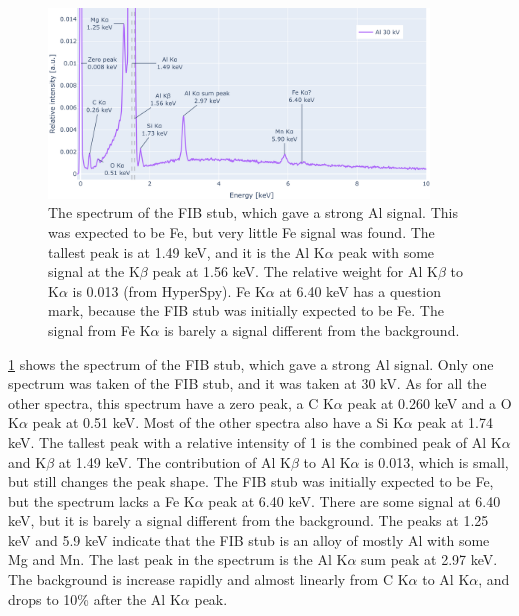 \begin{figure}[h!]
    \centering
    \includegraphics[width=0.90\textwidth]{figures/each_spectra/Al_everything.png}
    \caption{
        The spectrum of the FIB stub, which gave a strong Al signal.
        This was expected to be Fe, but very little Fe signal was found.
        The tallest peak is at 1.49 keV, and it is the Al K$\alpha$ peak with some signal at the K$\beta$ peak at 1.56 keV.
        The relative weight for Al K$\beta$ to K$\alpha$ is 0.013 (from HyperSpy).
        Fe K$\alpha$ at 6.40 keV has a question mark, because the FIB stub was initially expected to be Fe.
        The signal from Fe K$\alpha$ is barely a signal different from the background.
    }
    \label{fig:results:Spectra_Al}
\end{figure}

\cref{fig:results:Spectra_Al} shows the spectrum of the FIB stub, which gave a strong Al signal.
Only one spectrum was taken of the FIB stub, and it was taken at 30 kV.
As for all the other spectra, this spectrum have a zero peak, a C K$\alpha$ peak at 0.260 keV and a O K$\alpha$ peak at 0.51 keV.
Most of the other spectra also have a Si K$\alpha$ peak at 1.74 keV.
The tallest peak with a relative intensity of 1 is the combined peak of Al K$\alpha$ and K$\beta$ at 1.49 keV.
The contribution of Al K$\beta$ to Al K$\alpha$ is 0.013, which is small, but still changes the peak shape.
The FIB stub was initially expected to be Fe, but the spectrum lacks a Fe K$\alpha$ peak at 6.40 keV.
There are some signal at 6.40 keV, but it is barely a signal different from the background.
The peaks at 1.25 keV and 5.9 keV indicate that the FIB stub is an alloy of mostly Al with some Mg and Mn.
The last peak in the spectrum is the Al K$\alpha$ sum peak at 2.97 keV. %
The background is increase rapidly and almost linearly from C K$\alpha$ to Al K$\alpha$, and drops to 10\% after the Al K$\alpha$ peak.



